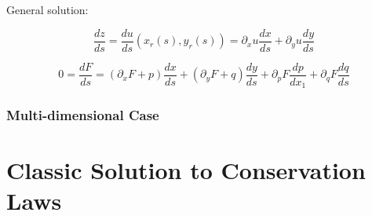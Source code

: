 General solution:

$$
\frac{d z}{d s}=\frac{d u}{d s}(x_r(s), y_r(s))=\partial_x u \frac{d x}{d s}+\partial_y u\frac{d y}{d s}
$$

$$
0=\frac{dF}{ds}=\left(\partial_{x} F+p\right) \frac{d x}{d s}+\left(\partial_{y} F+ q\right) \frac{d y}{d s}+\partial_{p} F \frac{d p}{d x_{1}}+\partial_{q} F \frac{d q}{d s}
$$

\subsubsection{Multi-dimensional Case}


\section{Classic Solution to Conservation Laws}
